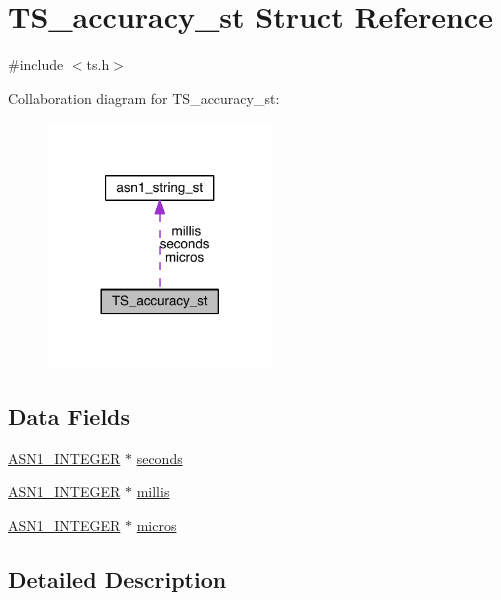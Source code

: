 \hypertarget{struct_t_s__accuracy__st}{}\section{T\+S\+\_\+accuracy\+\_\+st Struct Reference}
\label{struct_t_s__accuracy__st}


{\ttfamily \#include $<$ts.\+h$>$}



Collaboration diagram for T\+S\+\_\+accuracy\+\_\+st\+:\nopagebreak
\begin{figure}[H]
\begin{center}
\leavevmode
\includegraphics[width=168pt]{struct_t_s__accuracy__st__coll__graph}
\end{center}
\end{figure}
\subsection*{Data Fields}
\begin{DoxyCompactItemize}
\item 
\hyperlink{crypto_2ossl__typ_8h_af4335399bf9774cb410a5e93de65998b}{A\+S\+N1\+\_\+\+I\+N\+T\+E\+G\+ER} $\ast$ \hyperlink{struct_t_s__accuracy__st_ac2918a5dbb5a029747f5fab915d2fe6d}{seconds}
\item 
\hyperlink{crypto_2ossl__typ_8h_af4335399bf9774cb410a5e93de65998b}{A\+S\+N1\+\_\+\+I\+N\+T\+E\+G\+ER} $\ast$ \hyperlink{struct_t_s__accuracy__st_afe1fff95f07a821e65c7cb3e91fc63b0}{millis}
\item 
\hyperlink{crypto_2ossl__typ_8h_af4335399bf9774cb410a5e93de65998b}{A\+S\+N1\+\_\+\+I\+N\+T\+E\+G\+ER} $\ast$ \hyperlink{struct_t_s__accuracy__st_a0b58c483824a9d659c9d66f0513d8b50}{micros}
\end{DoxyCompactItemize}


\subsection{Detailed Description}


